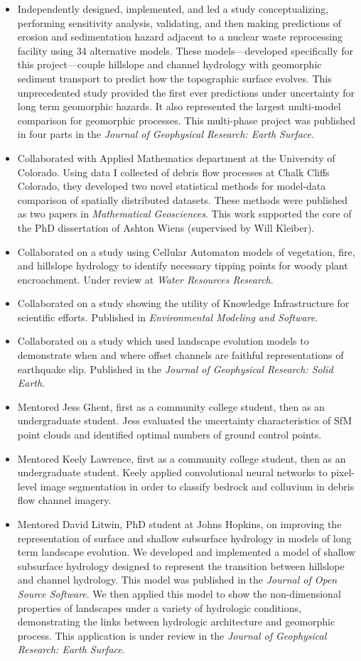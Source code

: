 \documentclass[10pt]{article}
\begin{document}
\begin{itemize}
\item Independently designed, implemented, and led a study conceptualizing, performing sensitivity analysis, validating, and then making predictions of erosion and sedimentation hazard adjacent to a nuclear waste reprocessing facility using 34 alternative models. These models---developed specifically for this project---couple hillslope and channel hydrology with geomorphic sediment transport to predict how the topographic surface evolves. This unprecedented study provided the first ever predictions under uncertainty for long term geomorphic hazards. It also represented the largest multi-model comparison for geomorphic processes. This multi-phase project was published in four parts in the \textit{Journal of Geophysical Research: Earth Surface}.
\item Collaborated with Applied Mathematics department at the University of Colorado. Using data I collected of debris flow processes at Chalk Cliffs Colorado, they developed two novel statistical methods for model-data comparison of spatially distributed datasets. These methods were published as two papers in \textit{Mathematical Geosciences}. This work supported the core of the PhD dissertation of Ashton Wiens (supervised by Will Kleiber). 
\item Collaborated on a study using Cellular Automaton models of vegetation, fire, and hillslope hydrology to identify necessary tipping points for woody plant encroachment. Under review at \textit{Water Resources Research}. 
\item Collaborated on a study showing the utility of Knowledge Infrastructure for scientific efforts. Published in \textit{Environmental Modeling and Software}.
\item Collaborated on a study which used landscape evolution models to demonstrate when and where offset channels are faithful representations of earthquake slip. Published in the \textit{Journal of Geophysical Research: Solid Earth}.
\item Mentored Jess Ghent, first as a community college student, then as an undergraduate student. Jess evaluated the uncertainty characteristics of SfM point clouds and identified optimal numbers of ground control points. 
\item Mentored Keely Lawrence, first as a community college student, then as an undergraduate student. Keely applied convolutional neural networks to pixel-level image segmentation in order to classify bedrock and colluvium in debris flow channel imagery.
\item Mentored David Litwin, PhD student at Johns Hopkins, on improving the representation of surface and shallow subsurface hydrology in models of long term landscape evolution. We developed and implemented a model of shallow subsurface hydrology designed to represent the transition between hillslope and channel hydrology. This model was published in the \textit{Journal of Open Source Software}. We then applied this model to show the non-dimensional properties of landscapes under a variety of hydrologic conditions, demonstrating the links between hydrologic architecture and geomorphic process. This application is under review in the \textit{Journal of Geophysical Research: Earth Surface}.

\end{itemize}
\end{document}
